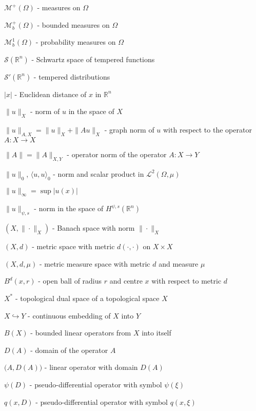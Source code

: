 \documentclass[a4paper, 12pt]{report}
\theoremstyle{remark}
\theoremstyle{definition}
\begin{document}
\noindent$\mathcal{M}^+(\Omega)$ - measures on $\Omega$

\noindent$\mathcal{M}_b^+(\Omega)$ - bounded measures on $\Omega$

\noindent$\mathcal{M}_b^1(\Omega)$ - probability measures on $\Omega$

\noindent$\mathcal{S}(\mathbb{R}^n)$ - Schwartz space of tempered functions

\noindent$\mathcal{S}'(\mathbb{R}^n)$ - tempered distributions

\bigbreak

\noindent$|x|$ - Euclidean distance of $x$ in $\mathbb{R}^n$

\noindent$\|u\|_X$ - norm of $u$ in the space of $X$

\noindent$\|u\|_{A, X} = \|u\|_X + \|Au\|_X$ - graph norm of $u$ with respect to the operator $A : X \to X$

\noindent$\|A\| = \|A\|_{X, Y}$ - operator norm of the operator $A : X \to Y$

\noindent$\|u\|_0$, $\langle u, u\rangle_0$ - norm and scalar product in $\mathcal{L}^2(\Omega, \mu)$

\noindent$\|u\|_\infty = \sup|u(x)|$

\noindent$\|u\|_{\psi, s}$ - norm in the space of $H^{\psi, s}(\mathbb{R}^n)$

\bigbreak

\noindent$(X, \|\cdot\|_X)$ - Banach space with norm $\|\cdot\|_X$

\noindent$(X, d)$ - metric space with metric $d(\cdot, \cdot)$ on $X \times X$

\noindent$(X, d, \mu)$ - metric measure space with metric $d$ and measure $\mu$

\noindent$B^d(x, r)$ - open ball of radius $r$ and centre $x$ with respect to metric $d$

\noindent$X^\ast$ - topological dual space of a topological space $X$

\noindent$X \hookrightarrow Y$ - continuous embedding of $X$ into $Y$

\noindent$B(X)$ - bounded linear operators from $X$ into itself

\noindent$D(A)$ - domain of the operator $A$

\noindent$\big(A, D(A)\big)$ - linear operator with domain $D(A)$

\noindent$\psi(D)$ - pseudo-differential operator with symbol $\psi(\xi)$

\noindent$q(x, D)$ - pseudo-differential operator with symbol $q(x, \xi)$
\end{document}
